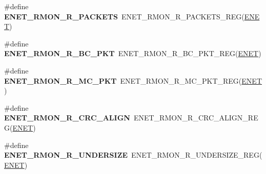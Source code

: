 \begin{DoxyCompactItemize}
\item 
\#define {\bfseries E\+N\+E\+T\+\_\+\+R\+M\+O\+N\+\_\+\+R\+\_\+\+P\+A\+C\+K\+E\+TS}~E\+N\+E\+T\+\_\+\+R\+M\+O\+N\+\_\+\+R\+\_\+\+P\+A\+C\+K\+E\+T\+S\+\_\+\+R\+EG(\hyperlink{group__ENET__Peripheral__Access__Layer_ga4745105f505f3ab949d6a57fbe2a0ed5}{E\+N\+ET})\hypertarget{group__ENET__Register__Accessor__Macros_ga320eaab3591dd85652568ed41eb0e816}{}\label{group__ENET__Register__Accessor__Macros_ga320eaab3591dd85652568ed41eb0e816}

\item 
\#define {\bfseries E\+N\+E\+T\+\_\+\+R\+M\+O\+N\+\_\+\+R\+\_\+\+B\+C\+\_\+\+P\+KT}~E\+N\+E\+T\+\_\+\+R\+M\+O\+N\+\_\+\+R\+\_\+\+B\+C\+\_\+\+P\+K\+T\+\_\+\+R\+EG(\hyperlink{group__ENET__Peripheral__Access__Layer_ga4745105f505f3ab949d6a57fbe2a0ed5}{E\+N\+ET})\hypertarget{group__ENET__Register__Accessor__Macros_gaebf9ade1ddf074f64cb7d3880cf48ffe}{}\label{group__ENET__Register__Accessor__Macros_gaebf9ade1ddf074f64cb7d3880cf48ffe}

\item 
\#define {\bfseries E\+N\+E\+T\+\_\+\+R\+M\+O\+N\+\_\+\+R\+\_\+\+M\+C\+\_\+\+P\+KT}~E\+N\+E\+T\+\_\+\+R\+M\+O\+N\+\_\+\+R\+\_\+\+M\+C\+\_\+\+P\+K\+T\+\_\+\+R\+EG(\hyperlink{group__ENET__Peripheral__Access__Layer_ga4745105f505f3ab949d6a57fbe2a0ed5}{E\+N\+ET})\hypertarget{group__ENET__Register__Accessor__Macros_ga7c12300a354d5e4d7fcdba27b63f0258}{}\label{group__ENET__Register__Accessor__Macros_ga7c12300a354d5e4d7fcdba27b63f0258}

\item 
\#define {\bfseries E\+N\+E\+T\+\_\+\+R\+M\+O\+N\+\_\+\+R\+\_\+\+C\+R\+C\+\_\+\+A\+L\+I\+GN}~E\+N\+E\+T\+\_\+\+R\+M\+O\+N\+\_\+\+R\+\_\+\+C\+R\+C\+\_\+\+A\+L\+I\+G\+N\+\_\+\+R\+EG(\hyperlink{group__ENET__Peripheral__Access__Layer_ga4745105f505f3ab949d6a57fbe2a0ed5}{E\+N\+ET})\hypertarget{group__ENET__Register__Accessor__Macros_ga25e7f9008cb3109fa60252ee05422a39}{}\label{group__ENET__Register__Accessor__Macros_ga25e7f9008cb3109fa60252ee05422a39}

\item 
\#define {\bfseries E\+N\+E\+T\+\_\+\+R\+M\+O\+N\+\_\+\+R\+\_\+\+U\+N\+D\+E\+R\+S\+I\+ZE}~E\+N\+E\+T\+\_\+\+R\+M\+O\+N\+\_\+\+R\+\_\+\+U\+N\+D\+E\+R\+S\+I\+Z\+E\+\_\+\+R\+EG(\hyperlink{group__ENET__Peripheral__Access__Layer_ga4745105f505f3ab949d6a57fbe2a0ed5}{E\+N\+ET})\hypertarget{group__ENET__Register__Accessor__Macros_gac02167e9de47c2ce9a0dfb51f0b24fa1}{}\label{group__ENET__Register__Accessor__Macros_gac02167e9de47c2ce9a0dfb51f0b24fa1}


\end{DoxyCompactItemize}
